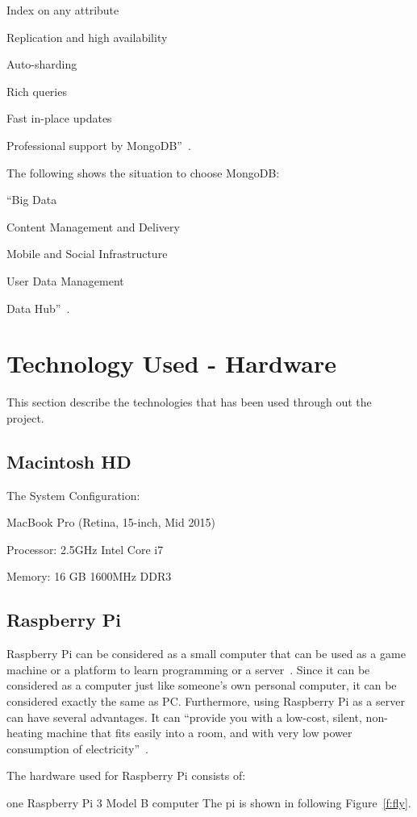 Index on any attribute

Replication and high availability

Auto-sharding

Rich queries

Fast in-place updates

Professional support by MongoDB''~\cite{hid-sp18-508-mon}. 


The following shows the situation to choose MongoDB:

``Big Data

Content Management and Delivery

Mobile and Social Infrastructure

User Data Management

Data Hub''~\cite{hid-sp18-508-mon}. 



\section{Technology Used - Hardware}
This section describe the technologies that has been used through out 
the project.

\subsection{Macintosh HD}
The System Configuration:

MacBook Pro (Retina, 15-inch, Mid 2015)

Processor: 2.5GHz Intel Core i7

Memory: 16 GB 1600MHz DDR3


\subsection{Raspberry Pi}
Raspberry Pi can be considered as a small computer that can be used 
as a game machine or a platform to learn programming or a 
server~\cite{hid-sp18-508-raspberryPi}. Since it can be considered as a
computer just like someone's own personal computer, it can be considered 
exactly the same as PC. Furthermore, using Raspberry Pi as a server can
have  several advantages. It can ``provide you with a low-cost, silent, 
non-heating
 machine that fits easily into a room, and with very low power consumption of
 electricity''~\cite{hid-sp18-508-raspberryServer}.

The hardware used for Raspberry Pi consists of: 

one Raspberry Pi 3 Model B computer
The pi is shown in following Figure~\ref{f:fly}.

